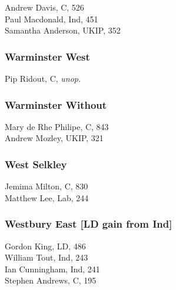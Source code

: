 \documentclass[a4paper,openany,10pt]{book}
\begin{document}


Andrew Davis, C, 526\\
Paul Macdonald, Ind, 451\\
Samantha Anderson, UKIP, 352\\


\subsubsection*{Warminster West}



Pip Ridout, C, \emph{unop.}\\


\subsubsection*{Warminster Without}



Mary de Rhe Philipe, C, 843\\
Andrew Mozley, UKIP, 321\\


\subsubsection*{West Selkley}



Jemima Milton, C, 830\\
Matthew Lee, Lab, 244\\


\subsubsection*{Westbury East \hspace*{\fill}\nolinebreak[1]%
\enspace\hspace*{\fill}
[LD gain from Ind]}



Gordon King, LD, 486\\
William Tout, Ind, 243\\
Ian Cunningham, Ind, 241\\
Stephen Andrews, C, 195\\
\end{document}
